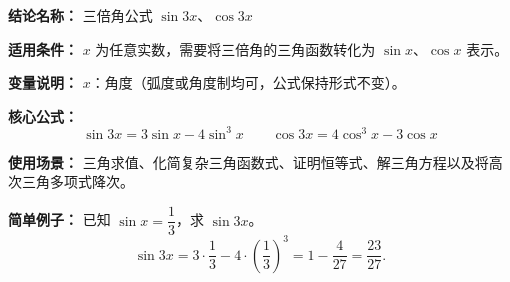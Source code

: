 \textbf{结论名称：} 三倍角公式 \(\sin 3x\)、\(\cos 3x\)

\textbf{适用条件：} \(x\) 为任意实数，需要将三倍角的三角函数转化为 \(\sin x\)、\(\cos x\) 表示。

\textbf{变量说明：} \(x\)：角度（弧度或角度制均可，公式保持形式不变）。

\textbf{核心公式：}
\[
\boxed{\sin 3x = 3\sin x - 4\sin^3 x}
\qquad
\boxed{\cos 3x = 4\cos^3 x - 3\cos x}
\]

\textbf{使用场景：} 三角求值、化简复杂三角函数式、证明恒等式、解三角方程以及将高次三角多项式降次。

\textbf{简单例子：}
已知 \(\sin x = \dfrac{1}{3}\)，求 \(\sin 3x\)。
\[
\sin 3x = 3\cdot\frac{1}{3} - 4\cdot\left(\frac{1}{3}\right)^3 = 1 - \frac{4}{27} = \frac{23}{27}.
\]